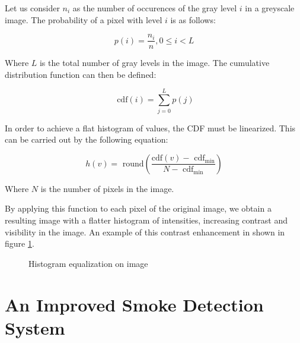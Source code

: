 \documentclass[lettersize,journal]{IEEEtran}
\begin{document}
Let us consider \(n_{i}\) as the number of occurences of the gray level
\(i\) in a greyscale image. The probability of a pixel with level \(i\)
is as follows:

\[p(i) = \frac{n_{i}}{n},0 \leq i < L\]

Where \(L\) is the total number of gray levels in the image. The
cumulative distribution function can then be defined:

\[\text{ cdf}(i) = \sum_{j = 0}^{L}p(j)\]

In order to achieve a flat histogram of values, the CDF must be
linearized. This can be carried out by the following equation:

\[h(v) = \text{ round}\left( \frac{\text{cdf}(v) - \text{ cdf}_{\text{min}}}{N - \text{ cdf}_{\min}} \right)\]

Where \(N\) is the number of pixels in the image.

By applying this function to each pixel of the original image, we obtain
a resulting image with a flatter histogram of intensities, increasing
contrast and visibility in the image. An example of this contrast enhancement in shown in figure \ref{heq}.

\begin{figure}
        \centering
        \hfil
        \caption{Histogram equalization on image}
        \label{heq}
\end{figure}

\section{An Improved Smoke Detection System}
\end{document}
